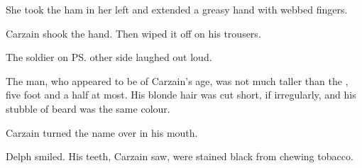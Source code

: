 \begin{garbage}
She took the ham in her left and extended a greasy hand with webbed fingers. 

 Carzain shook the hand. 
Then wiped it off on his trousers. 




% 
% 
% 
% 
% 

The \human{} soldier on \ps{\Tsekkect}{} other side laughed out loud. 

The man, who appeared to be of Carzain's age, was not much taller than the \meccaran, five foot and a half at most. 
His blonde hair was cut short, if irregularly, and his stubble of beard was the same colour. 

Carzain turned the name over in his mouth. 

Delph smiled. 
His teeth, Carzain saw, were stained black from chewing tobacco. 






\end{garbage}
